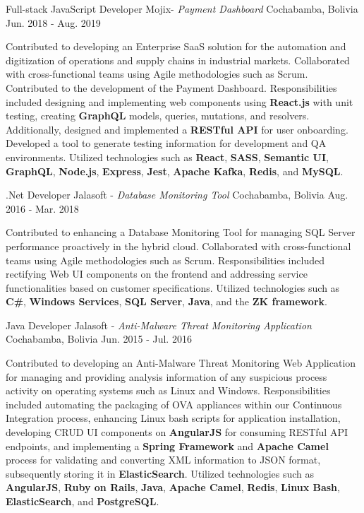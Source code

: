 \begin{cventries}
{\begin{cvitems}
      \end{cvitems} 
    }
\cventry
    {Full-stack JavaScript Developer}
    {Mojix- \textit{Payment Dashboard}}
    {Cochabamba, Bolivia}
    {Jun. 2018 - Aug. 2019}
    {
      \begin{cvitems}
         {Contributed to developing an Enterprise SaaS solution for the automation and digitization of operations and supply chains in industrial markets. Collaborated with cross-functional teams using Agile methodologies such as Scrum. Contributed to the development of the Payment Dashboard. Responsibilities included designing and implementing web components using \textbf{React.js} with unit testing, creating \textbf{GraphQL} models, queries, mutations, and resolvers. Additionally, designed and implemented a \textbf{RESTful API} for user onboarding. Developed a tool to generate testing information for development and QA environments. Utilized technologies such as \textbf{React}, \textbf{SASS}, \textbf{Semantic UI}, \textbf{GraphQL}, \textbf{Node.js}, \textbf{Express}, \textbf{Jest}, \textbf{Apache Kafka}, \textbf{Redis}, and \textbf{MySQL}.
}
      \end{cvitems} 
    }
\cventry
    {.Net Developer}
    {Jalasoft - \textit{Database Monitoring Tool}}
    {Cochabamba, Bolivia}
    {Aug. 2016 - Mar. 2018}
    {
      \begin{cvitems}
        {Contributed to enhancing a Database Monitoring Tool for managing SQL Server performance proactively in the hybrid cloud. Collaborated with cross-functional teams using Agile methodologies such as Scrum. Responsibilities included rectifying Web UI components on the frontend and addressing service functionalities based on customer specifications. Utilized technologies such as \textbf{C\#}, \textbf{Windows Services}, \textbf{SQL Server}, \textbf{Java}, and the \textbf{ZK framework}.}
      \end{cvitems} 
    }
\cventry
    {Java Developer}
    {Jalasoft - \textit{Anti-Malware Threat Monitoring Application}}
    {Cochabamba, Bolivia}
    {Jun. 2015 - Jul. 2016}
    {
      \begin{cvitems}
        {Contributed to developing an Anti-Malware Threat Monitoring Web Application for managing and providing analysis information of any suspicious process activity on operating systems such as Linux and Windows. Responsibilities included automating the packaging of OVA appliances within our Continuous Integration process, enhancing Linux bash scripts for application installation, developing CRUD UI components on \textbf{AngularJS} for consuming RESTful API endpoints, and implementing a \textbf{Spring Framework} and \textbf{Apache Camel} process for validating and converting XML information to JSON format, subsequently storing it in \textbf{ElasticSearch}. Utilized technologies such as \textbf{AngularJS}, \textbf{Ruby on Rails}, \textbf{Java}, \textbf{Apache Camel}, \textbf{Redis}, \textbf{Linux Bash}, \textbf{ElasticSearch}, and \textbf{PostgreSQL}.
}
      \end{cvitems}
    }


\end{cventries}
